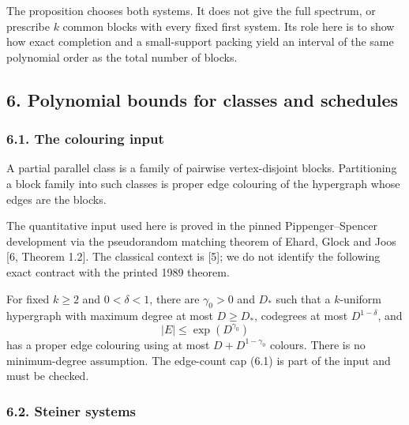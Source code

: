 \documentclass[english,11pt,a4paper]{article}
\begin{document}
The proposition chooses both systems. It does not give the full spectrum, or prescribe \(k\) common blocks with every fixed first system. Its role here is to show how exact completion and a small-support packing yield an interval of the same polynomial order as the total number of blocks.

\subsection{6. Polynomial bounds for classes and schedules}\label{polynomial-bounds-for-classes-and-schedules}


\subsubsection{6.1. The colouring input}\label{the-colouring-input}

A partial parallel class is a family of pairwise vertex-disjoint blocks. Partitioning a block family into such classes is proper edge colouring of the hypergraph whose edges are the blocks.

The quantitative input used here is proved in the pinned Pippenger--Spencer development via the pseudorandom matching theorem of Ehard, Glock and Joos {[}6, Theorem 1.2{]}. The classical context is {[}5{]}; we do not identify the following exact contract with the printed 1989 theorem.

For fixed \(k\ge2\) and \(0<\delta<1\), there are \(\gamma_0>0\) and \(D_*\) such that a \(k\)-uniform hypergraph with maximum degree at most \(D\ge D_*\), codegrees at most \(D^{1-\delta}\), and \[|E|\le\exp(D^{\gamma_0})
\tag{6.1}\] has a proper edge colouring using at most \(D+D^{1-\gamma_0}\) colours. There is no minimum-degree assumption. The edge-count cap (6.1) is part of the input and must be checked.


\subsubsection{6.2. Steiner systems}\label{steiner-systems}
\end{document}
